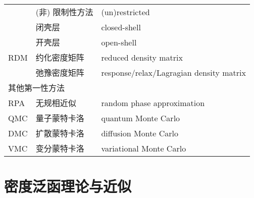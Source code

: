 \begin{longtable}{lll}
    & (非) 限制性方法 & (un)restricted \\
    & 闭壳层 & closed-shell \\
    & 开壳层 & open-shell \\
    RDM & 约化密度矩阵 & reduced density matrix \\
    & 弛豫密度矩阵 & response/relax/Lagragian density matrix \\
    \midrule
    \multicolumn{3}{l}{\textsf{其他第一性方法}} \\
    RPA & 无规相近似 & random phase approximation \\
    QMC & 量子蒙特卡洛 & quantum Monte Carlo \\
    DMC & 扩散蒙特卡洛 & diffusion Monte Carlo \\
    VMC & 变分蒙特卡洛 & variational Monte Carlo \\
\end{longtable}

\endgroup
    
\section*{密度泛函理论与近似}

\begingroup
\setlength{\LTleft}{-20cm plus -1fill}
\setlength{\LTright}{\LTleft}

